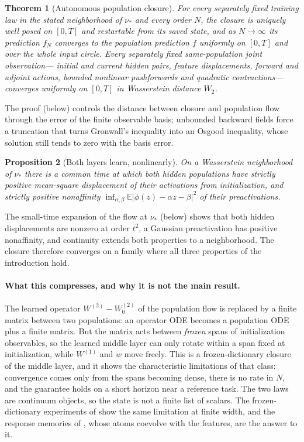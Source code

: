 \documentclass[11pt]{article}
\newtheorem{theorem}{Theorem}[section]
\newtheorem{proposition}[theorem]{Proposition}
\theoremstyle{definition}
\theoremstyle{remark}
\newcommand{\E}{\mathbb{E}}
\begin{document}
\begin{theorem}[Autonomous population closure]
\label{thm:popclosure}
For every separately fixed training law in the stated neighborhood of $\nu_*$
and every order $N$, the closure is uniquely well posed on $[0,T]$ and
restartable from its saved state, and as $N\to\infty$ its prediction $f_N$
converges to the population prediction $f$ uniformly on $[0,T]$ and over the
whole input circle.  Every separately fixed same-population joint observation---
initial and current hidden pairs, feature displacements, forward and adjoint
actions, bounded nonlinear pushforwards and quadratic contractions---converges
uniformly on $[0,T]$ in Wasserstein distance $W_2$.
\end{theorem}

The proof (below) controls the distance between closure and
population flow through the error of the finite observable basis; unbounded
backward fields force a truncation that turns Gronwall's inequality into an
Osgood inequality, whose solution still tends to zero with the basis error.

\begin{proposition}[Both layers learn, nonlinearly]
\label{prop:featurelearning}
On a Wasserstein neighborhood of $\nu_*$ there is a common time at which both
hidden populations have strictly positive mean-square displacement of their
activations from initialization, and strictly positive nonaffinity
$\inf_{\alpha,\beta}\E|\phi(z)-\alpha z-\beta|^2$ of their preactivations.
\end{proposition}

The small-time expansion of the flow at $\nu_*$ (below) shows
that both hidden displacements are nonzero at order $t^2$, a Gaussian
preactivation has positive nonaffinity, and continuity extends both properties
to a neighborhood.  The closure therefore converges on a family where all three
properties of the introduction hold.

\paragraph{What this compresses, and why it is not the main result.}
The learned operator $W^{(2)}-W^{(2)}_0$ of the population flow is replaced by a
finite matrix between two populations: an operator ODE becomes a population ODE
plus a finite matrix.  But the matrix acts between \emph{frozen} spans of
initialization observables, so the learned middle layer can only rotate within
a span fixed at initialization, while $W^{(1)}$ and $w$ move freely.  This is a
frozen-dictionary closure of the middle layer, and it shows the characteristic
limitations of that class: convergence comes only from the spans becoming
dense, there is no rate in $N$, and the guarantee holds on a short horizon near a
reference task.  The two laws are continuum objects, so the state is not a
finite list of scalars.  The frozen-dictionary experiments of
 show the same limitation at finite width, and the
response memories of , whose atoms coevolve with the features,
are the answer to it.
\end{document}
